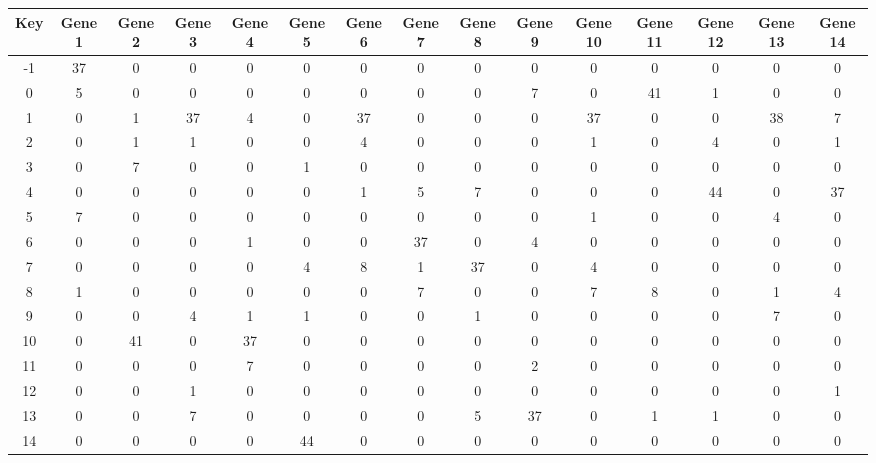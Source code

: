 \begin{tabular}{|c|c|c|c|c|c|c|c|c|c|c|c|c|c|c|}
\hline
Key & Gene 1 & Gene 2 & Gene 3 & Gene 4 & Gene 5 & Gene 6 & Gene 7 & Gene 8 & Gene 9 & Gene 10 & Gene 11 & Gene 12 & Gene 13 & Gene 14 \\
\hline
-1 & 37 & 0 & 0 & 0 & 0 & 0 & 0 & 0 & 0 & 0 & 0 & 0 & 0 & 0 \\
0 & 5 & 0 & 0 & 0 & 0 & 0 & 0 & 0 & 7 & 0 & 41 & 1 & 0 & 0 \\
1 & 0 & 1 & 37 & 4 & 0 & 37 & 0 & 0 & 0 & 37 & 0 & 0 & 38 & 7 \\
2 & 0 & 1 & 1 & 0 & 0 & 4 & 0 & 0 & 0 & 1 & 0 & 4 & 0 & 1 \\
3 & 0 & 7 & 0 & 0 & 1 & 0 & 0 & 0 & 0 & 0 & 0 & 0 & 0 & 0 \\
4 & 0 & 0 & 0 & 0 & 0 & 1 & 5 & 7 & 0 & 0 & 0 & 44 & 0 & 37 \\
5 & 7 & 0 & 0 & 0 & 0 & 0 & 0 & 0 & 0 & 1 & 0 & 0 & 4 & 0 \\
6 & 0 & 0 & 0 & 1 & 0 & 0 & 37 & 0 & 4 & 0 & 0 & 0 & 0 & 0 \\
7 & 0 & 0 & 0 & 0 & 4 & 8 & 1 & 37 & 0 & 4 & 0 & 0 & 0 & 0 \\
8 & 1 & 0 & 0 & 0 & 0 & 0 & 7 & 0 & 0 & 7 & 8 & 0 & 1 & 4 \\
9 & 0 & 0 & 4 & 1 & 1 & 0 & 0 & 1 & 0 & 0 & 0 & 0 & 7 & 0 \\
10 & 0 & 41 & 0 & 37 & 0 & 0 & 0 & 0 & 0 & 0 & 0 & 0 & 0 & 0 \\
11 & 0 & 0 & 0 & 7 & 0 & 0 & 0 & 0 & 2 & 0 & 0 & 0 & 0 & 0 \\
12 & 0 & 0 & 1 & 0 & 0 & 0 & 0 & 0 & 0 & 0 & 0 & 0 & 0 & 1 \\
13 & 0 & 0 & 7 & 0 & 0 & 0 & 0 & 5 & 37 & 0 & 1 & 1 & 0 & 0 \\
14 & 0 & 0 & 0 & 0 & 44 & 0 & 0 & 0 & 0 & 0 & 0 & 0 & 0 & 0 \\
\hline
\end{tabular}